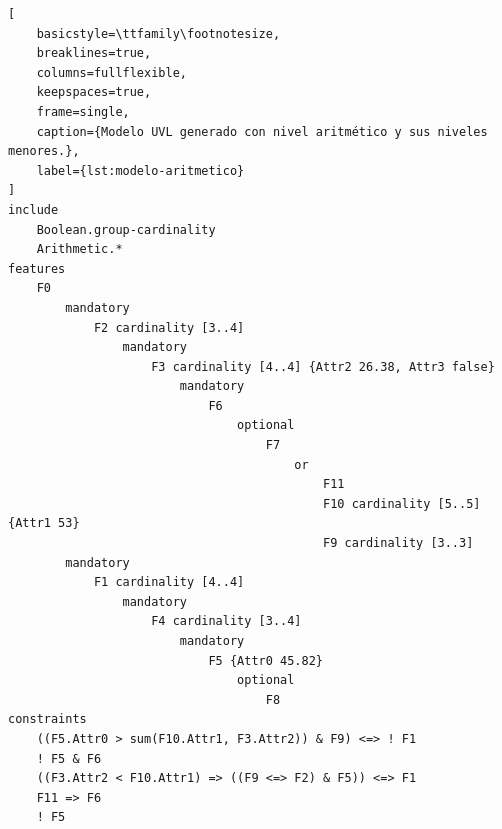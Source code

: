\begin{lstlisting}[
    basicstyle=\ttfamily\footnotesize,
    breaklines=true,
    columns=fullflexible,
    keepspaces=true,
    frame=single,
    caption={Modelo UVL generado con nivel aritmético y sus niveles menores.},
    label={lst:modelo-aritmetico}
]
include
    Boolean.group-cardinality
    Arithmetic.*
features
    F0
        mandatory
            F2 cardinality [3..4]
                mandatory
                    F3 cardinality [4..4] {Attr2 26.38, Attr3 false}
                        mandatory
                            F6
                                optional
                                    F7
                                        or
                                            F11
                                            F10 cardinality [5..5] {Attr1 53}
                                            F9 cardinality [3..3]
        mandatory
            F1 cardinality [4..4]
                mandatory
                    F4 cardinality [3..4]
                        mandatory
                            F5 {Attr0 45.82}
                                optional
                                    F8
constraints
    ((F5.Attr0 > sum(F10.Attr1, F3.Attr2)) & F9) <=> ! F1
    ! F5 & F6
    ((F3.Attr2 < F10.Attr1) => ((F9 <=> F2) & F5)) <=> F1
    F11 => F6
    ! F5
\end{lstlisting}

